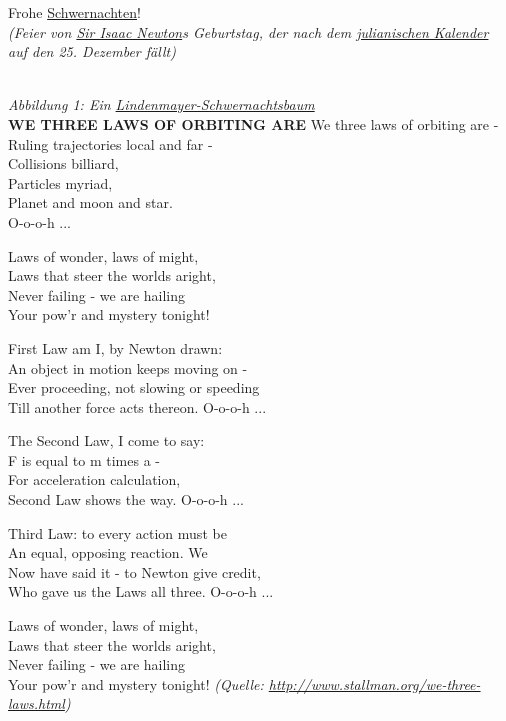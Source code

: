 \fancyhead[L]{}
\fancyhead[R]{}
\begin{center}
{\huge Frohe \href{http://www.stallman.org/grav-mass.html}{Schwernachten}!}\\
{\footnotesize\emph{(Feier von \href{https://de.wikipedia.org/wiki/Isaac_Newton}{Sir Isaac Newton}s Geburtstag, der nach dem \href{https://de.wikipedia.org/wiki/Julianischer_Kalender}{julianischen Kalender} auf den 25. Dezember fällt)}}\nl
{}\\
{\footnotesize\emph{Abbildung 1: Ein \href{https://de.wikipedia.org/wiki/Lindenmayer-System}{Lindenmayer-Schwernachtsbaum}}}\\[5mm]
\textbf{WE THREE LAWS OF ORBITING ARE}\nl
We three laws of orbiting are -\\
Ruling trajectories local and far -\\
Collisions billiard,\\
Particles myriad,\\
Planet and moon and star.\\
O-o-o-h ...\nl

Laws of wonder, laws of might,\\
Laws that steer the worlds aright,\\
Never failing - we are hailing\\
Your pow'r and mystery tonight!\nl

First Law am I, by Newton drawn:\\
An object in motion keeps moving on -\\
Ever proceeding, not slowing or speeding\\
Till another force acts thereon. O-o-o-h ...\nl

The Second Law, I come to say:\\
F is equal to m times a -\\
For acceleration calculation,\\
Second Law shows the way. O-o-o-h ...\nl

Third Law: to every action must be\\
An equal, opposing reaction. We\\
Now have said it - to Newton give credit,\\
Who gave us the Laws all three. O-o-o-h ...\nl

Laws of wonder, laws of might,\\
Laws that steer the worlds aright,\\
Never failing - we are hailing\\
Your pow'r and mystery tonight!\nl
{\footnotesize\emph{(Quelle: \href{http://www.stallman.org/we-three-laws.html}{http://www.stallman.org/we-three-laws.html})}}
\end{center}